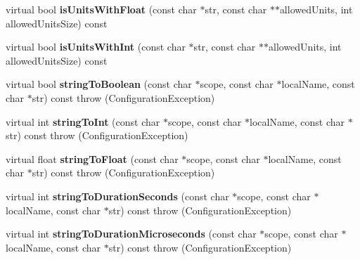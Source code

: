 \begin{DoxyCompactItemize}
\item 
\hypertarget{classCONFIG4CPP__NAMESPACE_1_1ConfigurationImpl_a0da18127d379dae9e8d38074cc284ae4}{virtual bool {\bfseries is\-Units\-With\-Float} (const char $\ast$str, const char $\ast$$\ast$allowed\-Units, int allowed\-Units\-Size) const }\label{classCONFIG4CPP__NAMESPACE_1_1ConfigurationImpl_a0da18127d379dae9e8d38074cc284ae4}

\item 
\hypertarget{classCONFIG4CPP__NAMESPACE_1_1ConfigurationImpl_affd1bb3bc1216f4056d0959c388f71af}{virtual bool {\bfseries is\-Units\-With\-Int} (const char $\ast$str, const char $\ast$$\ast$allowed\-Units, int allowed\-Units\-Size) const }\label{classCONFIG4CPP__NAMESPACE_1_1ConfigurationImpl_affd1bb3bc1216f4056d0959c388f71af}

\item 
\hypertarget{classCONFIG4CPP__NAMESPACE_1_1ConfigurationImpl_adee1f12e371341454d18c207b879c645}{virtual bool {\bfseries string\-To\-Boolean} (const char $\ast$scope, const char $\ast$local\-Name, const char $\ast$str) const   throw (\-Configuration\-Exception)}\label{classCONFIG4CPP__NAMESPACE_1_1ConfigurationImpl_adee1f12e371341454d18c207b879c645}

\item 
\hypertarget{classCONFIG4CPP__NAMESPACE_1_1ConfigurationImpl_acc230ca13464eb7aff255fc0b265c527}{virtual int {\bfseries string\-To\-Int} (const char $\ast$scope, const char $\ast$local\-Name, const char $\ast$str) const   throw (\-Configuration\-Exception)}\label{classCONFIG4CPP__NAMESPACE_1_1ConfigurationImpl_acc230ca13464eb7aff255fc0b265c527}

\item 
\hypertarget{classCONFIG4CPP__NAMESPACE_1_1ConfigurationImpl_a89b03a102f38df87636427685b32577a}{virtual float {\bfseries string\-To\-Float} (const char $\ast$scope, const char $\ast$local\-Name, const char $\ast$str) const   throw (\-Configuration\-Exception)}\label{classCONFIG4CPP__NAMESPACE_1_1ConfigurationImpl_a89b03a102f38df87636427685b32577a}

\item 
\hypertarget{classCONFIG4CPP__NAMESPACE_1_1ConfigurationImpl_a8994afc7b5187532053ef22d18b8bf2c}{virtual int {\bfseries string\-To\-Duration\-Seconds} (const char $\ast$scope, const char $\ast$local\-Name, const char $\ast$str) const   throw (\-Configuration\-Exception)}\label{classCONFIG4CPP__NAMESPACE_1_1ConfigurationImpl_a8994afc7b5187532053ef22d18b8bf2c}

\item 
\hypertarget{classCONFIG4CPP__NAMESPACE_1_1ConfigurationImpl_af5a3351cc10c3166df4f6a1918ad582b}{virtual int {\bfseries string\-To\-Duration\-Microseconds} (const char $\ast$scope, const char $\ast$local\-Name, const char $\ast$str) const   throw (\-Configuration\-Exception)}\label{classCONFIG4CPP__NAMESPACE_1_1ConfigurationImpl_af5a3351cc10c3166df4f6a1918ad582b}


\end{DoxyCompactItemize}
